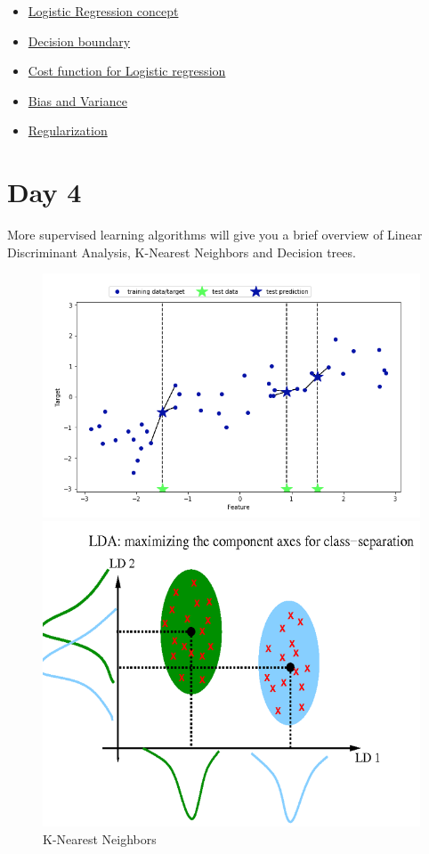 \documentclass[11pt]{article}
\begin{document}
\begin{itemize}
\item \href{https://www.youtube.com/watch?v=t1IT5hZfS48}{Logistic Regression concept}
\item \href{https://www.youtube.com/watch?v=F_VG4LNjZZ}{Decision boundary}
\item \href{https://www.youtube.com/watch?v=HIQlmHxI6-0}{Cost function for Logistic regression}
\item \href{https://www.youtube.com/watch?v=ISBGFY-gBug}{Bias and Variance}
\item \href{https://www.youtube.com/watch?v=KvtGD37Rm5I}{Regularization}
\end{itemize}
\section{Day 4}
More supervised learning algorithms will give you a brief overview of Linear Discriminant Analysis, K-Nearest Neighbors and Decision trees. 
\begin{figure}[h!]
\begin{center}
\includegraphics[scale=.5]{img/knn2.png}
\end{center}
{\caption*{K-Nearest Neighbors}}
\begin{center}
\includegraphics[scale=.6]{img/lda.png}
\end{center}
\end{figure}
\end{document}

